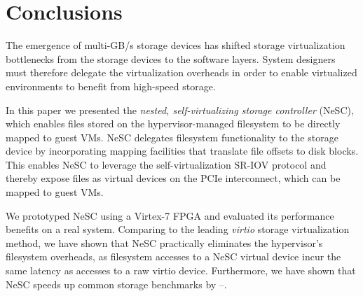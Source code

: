 \section{Conclusions}
\label{sec:conclusions}

The emergence of multi-GB/s storage devices has shifted storage virtualization bottlenecks from the storage devices to the software layers. System designers must therefore delegate the virtualization overheads in order to enable virtualized environments to benefit from high-speed storage. 

In this paper we presented the \emph{nested, self-virtualizing storage controller} (NeSC), which enables files stored on the hypervisor-managed filesystem to be directly mapped to guest VMs. NeSC delegates filesystem functionality to the storage device by incorporating mapping facilities that translate file offsets to disk blocks. This enables NeSC to leverage the self-virtualization SR-IOV protocol and thereby expose files as virtual devices on the PCIe interconnect, which can be mapped to guest VMs.

We prototyped NeSC using a Virtex-7 FPGA and evaluated its performance benefits on a real system. Comparing to the leading \emph{virtio} storage virtualization method, we have shown that NeSC practically eliminates the hypervisor's filesystem overheads, as filesystem accesses to a NeSC virtual device incur the same latency as accesses to a raw virtio device.
Furthermore, we have shown that NeSC speeds up common storage benchmarks by --.
